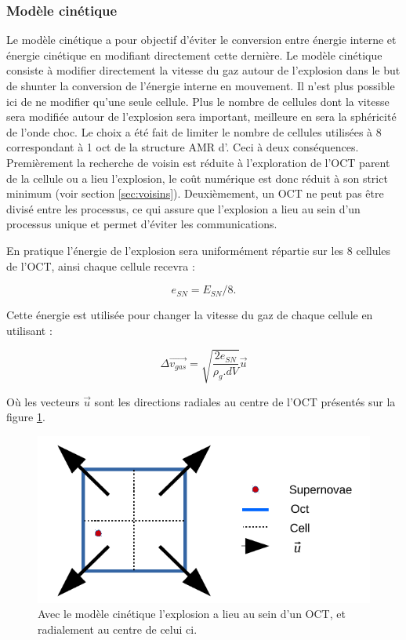 \subsubsection{Modèle cinétique}

Le modèle cinétique a pour objectif d'éviter le conversion entre énergie interne et énergie cinétique en modifiant directement cette dernière.
Le modèle cinétique consiste à modifier directement la vitesse du gaz autour de l'explosion dans le but de shunter la conversion de l'énergie interne en mouvement.
Il n'est plus possible ici de ne modifier qu'une seule cellule.
Plus le nombre de cellules dont la vitesse sera modifiée autour de l'explosion sera important, meilleure en sera la sphéricité de l'onde choc.
Le choix a été fait de limiter le nombre de cellules utilisées à 8 correspondant à 1 oct de la structure \ac{AMR} d'\emma .
Ceci à deux conséquences.
Premièrement la recherche de voisin est réduite à l'exploration de l'OCT parent de la cellule ou a lieu l'explosion, le coût numérique est donc réduit à son strict minimum (voir section \ref{sec:voisins}).
Deuxièmement, un OCT ne peut pas être divisé entre les processus, ce qui assure que l'explosion a lieu au sein d'un processus unique et permet d'éviter les communications.

En pratique l'énergie de l'explosion sera uniformément répartie sur les 8 cellules de l'OCT, ainsi chaque cellule recevra : 

\begin{equation}
e_{SN} = E_{SN}/8.
\end{equation}

Cette énergie est utilisée pour changer la vitesse du gaz de chaque cellule en utilisant : 

\begin{equation}
    \Delta \overrightarrow{v_{gas}} = \sqrt{\frac{2e_{SN}}{\rho_g.dV}} \overrightarrow{u}
    \label{eq_sn_direct}
\end{equation}

Où les vecteurs $\overrightarrow{u}$ sont les directions radiales au centre de l'OCT présentés sur la figure \ref{fig:kin}.

\begin{figure}
        \includegraphics[width=.95\linewidth]{img/03/oct_kinetic.pdf} 
        \caption[Injection d'énergie cinétique]{Avec le modèle cinétique l'explosion a lieu au sein d'un OCT, et radialement au centre de celui ci.
 		\label{fig:kin}}
\end{figure}

